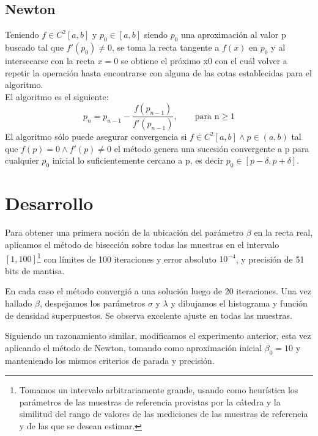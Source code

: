 \documentclass[a4paper,10pt,twoside]{article}
\begin{document}
\subsection{Newton}
Teniendo $f \in C^2[a,b]$ y $p_0 \in [a, b]$ siendo $p_0$ una aproximación al valor p buscado tal que $f'(p_0) \neq 0$, se toma la recta tangente a $f(x)$ en $p_0$ y al intersecarse con la recta $x = 0$ se obtiene el próximo x0 con el cuál volver a repetir la operación hasta encontrarse con alguna de las cotas establecidas para el algoritmo. \\
El algoritmo es el siguiente: 
\begin{equation*}
	p_n = p_{n-1} - \frac{f(p_{n-1})}{f'(p_{n-1})} , \qquad \text{para n} \geq 1
\end{equation*}
El algoritmo sólo puede asegurar convergencia si $f \in C^2[a,b] \land p \in (a,b)$ tal que $f(p) = 0 \land f'(p) \neq 0$ el método genera una sucesión convergente a p para cualquier $p_0$ inicial lo suficientemente cercano a p, es decir $p_0 \in [p-\delta,p+\delta]$.


\section{Desarrollo}

Para obtener una primera noción de la ubicación del parámetro $\beta$ en la
recta real, aplicamos el método de bisección sobre todas las muestras en el
intervalo $[1, 100]$\footnote{Tomamos un intervalo arbitrariamente grande,
usando como heurística los parámetros de las muestras de referencia provistas
por la cátedra y la similitud del rango de valores de las mediciones de las
muestras de referencia y de las que se desean estimar.} con límites de 100
iteraciones y error absoluto $10^{-4}$, y precisión de 51 bits de mantisa.

En cada caso el método convergió a una solución luego de 20 iteraciones.
Una vez hallado $\beta$, despejamos los parámetros $\sigma$ y $\lambda$ y
dibujamos el histograma y función de densidad superpuestos. Se observa
excelente ajuste en todas las muestras.

Siguiendo un razonamiento similar, modificamos el experimento anterior,
esta vez aplicando el método de Newton, tomando como aproximación inicial
$\beta_0 = 10$ y manteniendo los mismos criterios de parada y precisión.
\end{document}
